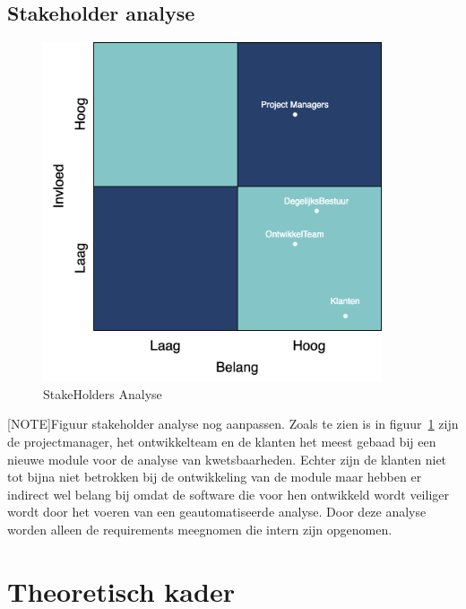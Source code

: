 \subsection{Stakeholder analyse}\label{subsec:stakeholder-analyse1}
\begin{figure}[H]
    \myfloatalign
    \includegraphics[width=10cm]{gfx/stakeholderanalyse}
    \caption{StakeHolders Analyse}
    \label{fig:StakeholderAnalyse1}
\end{figure}
[NOTE]Figuur stakeholder analyse nog aanpassen.
Zoals te zien is in figuur~\ref{fig:StakeholderAnalyse1} zijn de projectmanager, het ontwikkelteam en de klanten het meest gebaad bij een nieuwe module voor de analyse van kwetsbaarheden.
Echter zijn de klanten niet tot bijna niet betrokken bij de ontwikkeling van de module maar hebben er indirect wel belang bij omdat de software die voor hen ontwikkeld wordt veiliger wordt door het voeren van een geautomatiseerde analyse.
Door deze analyse worden alleen de requirements meegnomen die intern zijn opgenomen.


\section{Theoretisch kader}\label{sec:theoretisch-kader}


